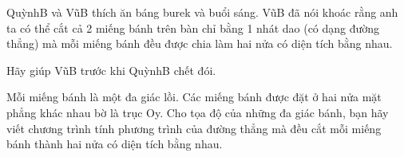 QuỳnhB và VũB thích ăn báng burek và buổi sáng. VũB đã nói khoác rằng anh ta có thể cắt cả 2 miếng bánh trên bàn chỉ bằng 1 nhát dao (có dạng đường thẳng) mà mỗi miếng bánh đều được chia làm hai nửa có diện tích bằng nhau.  

   Hãy giúp VũB trước khi QuỳnhB chết đói.  





   Mỗi miếng bánh là một đa giác lồi. Các miếng bánh được đặt ở hai nửa mặt phẳng khác nhau bờ là trục Oy. Cho tọa độ của những đa giác bánh, bạn hãy viết chương trình tính phương trình của đường thẳng mà đều cắt mỗi miếng bánh thành hai nửa có diện tích bằng nhau.